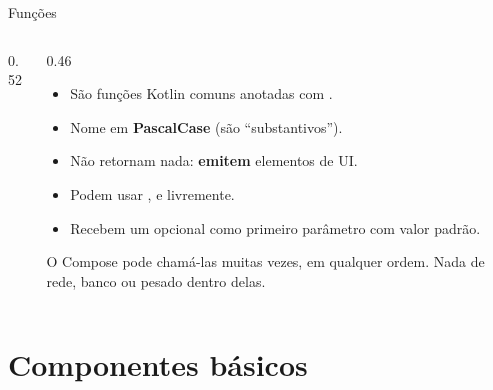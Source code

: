 \documentclass[aspectratio=169,10pt]{beamer}
\begin{document}
\begin{frame}[fragile]{Funções }
  \begin{columns}[T]
    \begin{column}{0.52\textwidth}
    \end{column}
    \begin{column}{0.46\textwidth}
      \small
      \begin{itemize}
        \item São funções Kotlin comuns anotadas com .
        \item Nome em \textbf{PascalCase} (são ``substantivos'').
        \item Não retornam nada: \textbf{emitem} elementos de UI.
        \item Podem usar ,  e  livremente.
        \item Recebem um  opcional como primeiro parâmetro com valor padrão.
      \end{itemize}
      \begin{atencao}
        O Compose pode chamá-las muitas vezes, em qualquer ordem. Nada de rede, banco ou  pesado dentro delas.
      \end{atencao}
    \end{column}
  \end{columns}
\end{frame}

\section{Componentes básicos}
\end{document}
